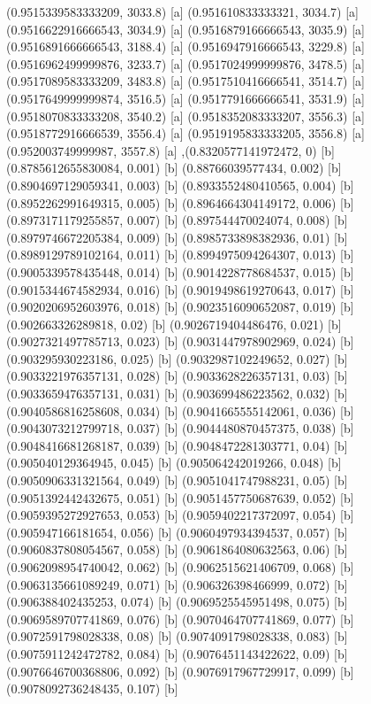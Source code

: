 {{{(0.9515339583333209, 3033.8) [a] 
(0.951610833333321, 3034.7) [a] 
(0.9516622916666543, 3034.9) [a] 
(0.9516879166666543, 3035.9) [a] 
(0.9516891666666543, 3188.4) [a] 
(0.9516947916666543, 3229.8) [a] 
(0.9516962499999876, 3233.7) [a] 
(0.9517024999999876, 3478.5) [a] 
(0.9517089583333209, 3483.8) [a] 
(0.9517510416666541, 3514.7) [a] 
(0.9517649999999874, 3516.5) [a] 
(0.9517791666666541, 3531.9) [a] 
(0.9518070833333208, 3540.2) [a] 
(0.9518352083333207, 3556.3) [a] 
(0.9518772916666539, 3556.4) [a] 
(0.9519195833333205, 3556.8) [a] 
(0.952003749999987, 3557.8) [a] 
},{(0.8320577141972472, 0) [b] 
(0.8785612655830084, 0.001) [b] 
(0.88766039577434, 0.002) [b] 
(0.8904697129059341, 0.003) [b] 
(0.8933552480410565, 0.004) [b] 
(0.8952262991649315, 0.005) [b] 
(0.8964664304149172, 0.006) [b] 
(0.8973171179255857, 0.007) [b] 
(0.897544470024074, 0.008) [b] 
(0.8979746672205384, 0.009) [b] 
(0.8985733898382936, 0.01) [b] 
(0.8989129789102164, 0.011) [b] 
(0.8994975094264307, 0.013) [b] 
(0.9005339578435448, 0.014) [b] 
(0.9014228778684537, 0.015) [b] 
(0.9015344674582934, 0.016) [b] 
(0.9019498619270643, 0.017) [b] 
(0.9020206952603976, 0.018) [b] 
(0.9023516090652087, 0.019) [b] 
(0.902663326289818, 0.02) [b] 
(0.9026719404486476, 0.021) [b] 
(0.9027321497785713, 0.023) [b] 
(0.9031447978902969, 0.024) [b] 
(0.903295930223186, 0.025) [b] 
(0.9032987102249652, 0.027) [b] 
(0.9033221976357131, 0.028) [b] 
(0.9033628226357131, 0.03) [b] 
(0.9033659476357131, 0.031) [b] 
(0.903699486223562, 0.032) [b] 
(0.9040586816258608, 0.034) [b] 
(0.9041665555142061, 0.036) [b] 
(0.9043073212799718, 0.037) [b] 
(0.9044480870457375, 0.038) [b] 
(0.9048416681268187, 0.039) [b] 
(0.9048472281303771, 0.04) [b] 
(0.905040129364945, 0.045) [b] 
(0.905064242019266, 0.048) [b] 
(0.9050906331321564, 0.049) [b] 
(0.9051041747988231, 0.05) [b] 
(0.9051392442432675, 0.051) [b] 
(0.9051457750687639, 0.052) [b] 
(0.9059395272927653, 0.053) [b] 
(0.9059402217372097, 0.054) [b] 
(0.905947166181654, 0.056) [b] 
(0.9060497934394537, 0.057) [b] 
(0.9060837808054567, 0.058) [b] 
(0.9061864080632563, 0.06) [b] 
(0.9062098954740042, 0.062) [b] 
(0.9062515621406709, 0.068) [b] 
(0.9063135661089249, 0.071) [b] 
(0.906326398466999, 0.072) [b] 
(0.906388402435253, 0.074) [b] 
(0.9069525545951498, 0.075) [b] 
(0.9069589707741869, 0.076) [b] 
(0.9070464707741869, 0.077) [b] 
(0.9072591798028338, 0.08) [b] 
(0.9074091798028338, 0.083) [b] 
(0.9075911242472782, 0.084) [b] 
(0.9076451143422622, 0.09) [b] 
(0.9076646700368806, 0.092) [b] 
(0.9076917967729917, 0.099) [b] 
(0.9078092736248435, 0.107) [b] 
}}}

